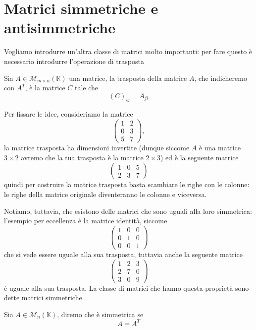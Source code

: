 \section{Matrici simmetriche e antisimmetriche}
Vogliamo introdurre un'altra classe di matrici molto importanti: per fare questo è necessario introdurre l'operazione di trasposta
\begin{definition}
  Sia $A \in \mathcal{M}_{m \times n}(\mathbb{K})$ una matrice, la trasposta della matrice $A$, che indicheremo con $A^T$, è la matrice $C$ tale che
  $$
    (C)_{ij} = A_{ji}
  $$
\end{definition}
\begin{example}
  Per fissare le idee, consideriamo la matrice
  $$
    \begin{pmatrix}
      1 & 2 \\
      0 & 3 \\
      5 & 7
    \end{pmatrix},
  $$
  la matrice trasposta ha dimensioni invertite (dunque siccome $A$ è una matrice $3 \times 2$ avremo che la tua trasposta è la matrice $2 \times 3$) ed è la seguente matrice
  $$
    \begin{pmatrix}
      1 & 0 & 5 \\
      2 & 3 & 7
    \end{pmatrix}
  $$
  quindi per costruire la matrice trasposta basta scambiare le righe con le colonne: le righe della matrice originale diventeranno le colonne e viceversa.
\end{example}
Notiamo, tuttavia, che esistono delle matrici che sono uguali alla loro simmetrica: l'esempio per eccellenza è la matrice identità, siccome
$$
  \begin{pmatrix}
    1 & 0 & 0 \\
    0 & 1 & 0 \\
    0 & 0 & 1
  \end{pmatrix}
$$
che si vede essere uguale alla sua trasposta, tuttavia anche la seguente matrice
$$
  \begin{pmatrix}
    1 & 2 & 3 \\
    2 & 7 & 0 \\
    3 & 0 & 9
  \end{pmatrix}
$$
è uguale alla sua trasposta. La classe di matrici che hanno questa proprietà sono dette matrici simmetriche
\begin{definition}
  Sia $A \in \mathcal{M}_n(\mathbb{K})$, diremo che è simmetrica se
  $$
    A = A^T
  $$
\end{definition}
